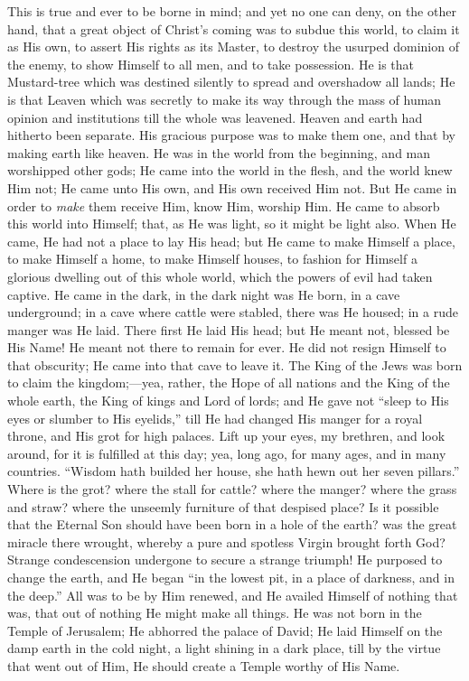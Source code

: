 This is true and ever to be borne in mind; and yet no one can deny,
on the other hand, that a great object of Christ's coming was to
subdue this world, to claim it as His own, to assert His rights as its
Master, to destroy the usurped dominion of the enemy, to show Himself
to all men, and to take possession. He is that Mustard-tree which was
destined silently to spread and overshadow all lands; He is that
Leaven which was secretly to make its way through the mass of human
opinion and institutions till the whole was leavened. Heaven and earth
had hitherto been separate. His gracious purpose was to make them one,
and that by making earth like heaven. He was in the world from the
beginning, and man worshipped other gods; He came into the world in
the flesh, and the world knew Him not; He came unto His own, and His
own received Him not. But He came in order to \emph{make} them receive
Him, know Him, worship Him. He came to absorb this world into Himself;
that, as He was light, so it might be light also. When He came, He had
not a place to lay His head; but He came to make Himself a place, to
make Himself a home, to make Himself houses, to fashion for Himself a
glorious dwelling out of this whole world, which the powers of evil
had taken captive. He came in the dark, in the dark night was He born,
in a cave underground; in a cave where cattle were stabled, there was
He housed; in a rude manger was He laid. There first He laid His head;
but He meant not, blessed be His Name! He meant not there to remain
for ever. He did not resign Himself to that obscurity; He came into
that cave to leave it. The King of the Jews was born to claim the
kingdom;—yea, rather, the Hope of all nations and the King of the
whole earth, the King of kings and Lord of lords; and He gave not
``sleep to His eyes or slumber to His eyelids,'' till He had
changed His manger for a royal throne, and His grot for high palaces.
Lift up your eyes, my brethren, and look around, for it is fulfilled
at this day; yea, long ago, for many ages, and in many countries.
``Wisdom hath builded her house, she hath hewn out her seven
pillars.'' Where is the grot? where the stall for cattle? where
the manger? where the grass and straw? where the unseemly furniture of
that despised place? Is it possible that the Eternal Son should have
been born in a hole of the earth? was the great miracle there wrought,
whereby a pure and spotless Virgin brought forth God? Strange
condescension undergone to secure a strange triumph! He purposed to
change the earth, and He began ``in the lowest pit, in a place of
darkness, and in the deep.'' All was to be by Him renewed, and He
availed Himself of nothing that was, that out of nothing He might make
all things. He was not born in the Temple of Jerusalem; He abhorred
the palace of David; He laid Himself on the damp earth in the cold
night, a light shining in a dark place, till by the virtue that went
out of Him, He should create a Temple worthy of His Name.

